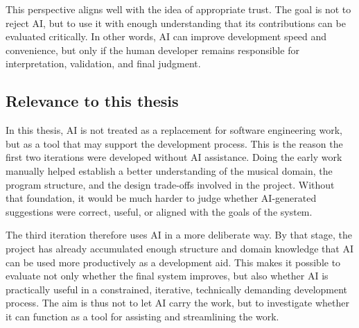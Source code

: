   This perspective aligns well with the idea of appropriate trust. The goal is not to reject \ac{AI}, but to use it with enough understanding that its contributions can be evaluated critically. In other words, \ac{AI} can improve development speed and convenience, but only if the human developer remains responsible for interpretation, validation, and final judgment.

  \subsection{Relevance to this thesis}
  In this thesis, \ac{AI} is not treated as a replacement for software engineering work, but as a tool that may support the development process. This is the reason the first two iterations were developed without \ac{AI} assistance. Doing the early work manually helped establish a better understanding of the musical domain, the program structure, and the design trade-offs involved in the project. Without that foundation, it would be much harder to judge whether \ac{AI}-generated suggestions were correct, useful, or aligned with the goals of the system.

  The third iteration therefore uses \ac{AI} in a more deliberate way. By that stage, the project has already accumulated enough structure and domain knowledge that \ac{AI} can be used more productively as a development aid. This makes it possible to evaluate not only whether the final system improves, but also whether \ac{AI} is practically useful in a constrained, iterative, technically demanding development process. The aim is thus not to let \ac{AI} carry the work, but to investigate whether it can function as a tool for assisting and streamlining the work.
